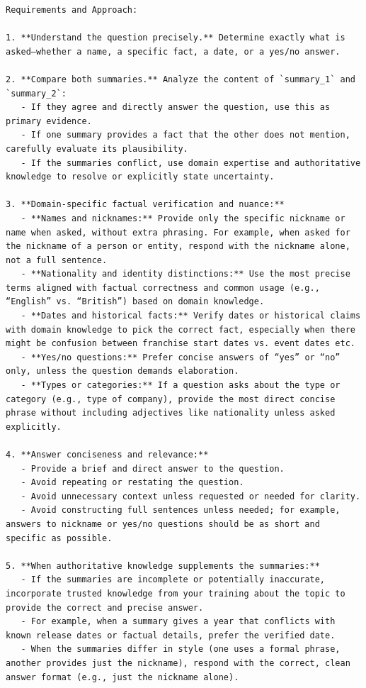 \begin{instructbox}
\begin{lstlisting}[breakindent=0pt, breaklines=true, breakatwhitespace=true, frame=single, backgroundcolor=\color{blue!10}]
Requirements and Approach:

1. **Understand the question precisely.** Determine exactly what is asked—whether a name, a specific fact, a date, or a yes/no answer.

2. **Compare both summaries.** Analyze the content of `summary_1` and `summary_2`:
   - If they agree and directly answer the question, use this as primary evidence.
   - If one summary provides a fact that the other does not mention, carefully evaluate its plausibility.
   - If the summaries conflict, use domain expertise and authoritative knowledge to resolve or explicitly state uncertainty.

3. **Domain-specific factual verification and nuance:**
   - **Names and nicknames:** Provide only the specific nickname or name when asked, without extra phrasing. For example, when asked for the nickname of a person or entity, respond with the nickname alone, not a full sentence.
   - **Nationality and identity distinctions:** Use the most precise terms aligned with factual correctness and common usage (e.g., “English” vs. “British”) based on domain knowledge.
   - **Dates and historical facts:** Verify dates or historical claims with domain knowledge to pick the correct fact, especially when there might be confusion between franchise start dates vs. event dates etc.
   - **Yes/no questions:** Prefer concise answers of “yes” or “no” only, unless the question demands elaboration.
   - **Types or categories:** If a question asks about the type or category (e.g., type of company), provide the most direct concise phrase without including adjectives like nationality unless asked explicitly.

4. **Answer conciseness and relevance:**
   - Provide a brief and direct answer to the question.
   - Avoid repeating or restating the question.
   - Avoid unnecessary context unless requested or needed for clarity.
   - Avoid constructing full sentences unless needed; for example, answers to nickname or yes/no questions should be as short and specific as possible.

5. **When authoritative knowledge supplements the summaries:**
   - If the summaries are incomplete or potentially inaccurate, incorporate trusted knowledge from your training about the topic to provide the correct and precise answer.
   - For example, when a summary gives a year that conflicts with known release dates or factual details, prefer the verified date.
   - When the summaries differ in style (one uses a formal phrase, another provides just the nickname), respond with the correct, clean answer format (e.g., just the nickname alone).


\end{lstlisting}
\end{instructbox}
